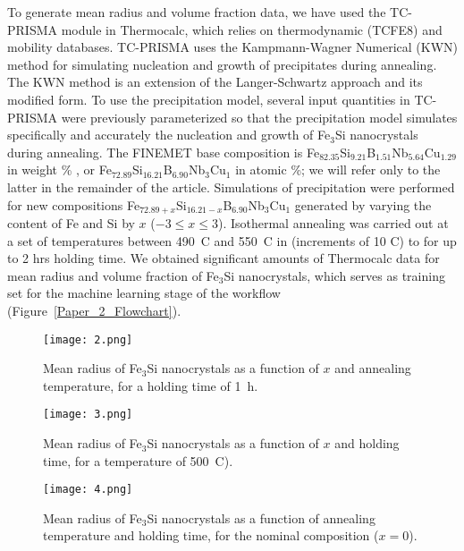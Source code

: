 To generate mean radius and volume fraction data, \cite{CITRINE} we have used the
TC-PRISMA\cite{THERMOCALC_TCPRISMA} module in Thermocalc, which relies on thermodynamic (TCFE8)\cite{THERMOCALC_TCFE8}  and mobility\cite{THERMOCALC_TCFE8_MOBFE3} databases.
TC-PRISMA\cite{THERMOCALC_TCPRISMA} uses the Kampmann-Wagner Numerical (KWN) method\cite{kampmann1984decomposition, wagner1991homogeneous} for simulating
nucleation and growth of precipitates during annealing. The KWN method is an extension of the Langer-Schwartz approach\cite{langer1980kinetics} and its modified form.\cite{COMPUTHERM}
To use the precipitation model, several input quantities in TC-PRISMA\cite{THERMOCALC_TCPRISMA} were previously parameterized\cite{jha2017FINEMET_CALPHAD} so that the
precipitation model simulates specifically and accurately the nucleation and growth of Fe$_3$Si nanocrystals  during
annealing.
The FINEMET base composition is  Fe$_{82.35}$Si$_{9.21}$B$_{1.51}$Nb$_{5.64}$Cu$_{1.29}$ in  weight \% , or  Fe$_{72.89}$Si$_{16.21}$B$_{6.90}$Nb$_{3}$Cu$_{1}$ in atomic \%; we will refer only to the latter in the remainder of the article.
Simulations of precipitation were performed for new compositions Fe$_{72.89 +x}$Si$_{16.21-x}$B$_{6.90}$Nb$_{3}$Cu$_{1}$ generated by varying the content of Fe and Si by $x$ ($-3 \leq x \leq 3$). Isothermal annealing was carried out at a set of temperatures between 490~\degree C and 550~\degree C in (increments of 10 \degree C) to for up to 2 hrs holding time. We obtained significant amounts of Thermocalc data for mean radius and volume fraction of Fe$_3$Si nanocrystals, \cite{CITRINE} which serves as training set for the machine learning stage of the workflow (Figure~\ref{Paper_2_Flowchart}).

\begin{figure}[ht]
\centering
\texttt{[image: 2.png]}
\caption{Mean radius of Fe$_3$Si nanocrystals as a function of $x$ and  annealing temperature, for a holding time of 1~h.\cite{CITRINE}}
\label{Mean_rad_3D_Temp_X}
\end{figure}

\begin{figure}[ht]
\centering
\texttt{[image: 3.png]}
\caption{Mean radius of Fe$_3$Si nanocrystals as a function of $x$ and  holding time, for a temperature of 500~\degree C).\cite{CITRINE} }
\label{Mean_rad_3D_Time_X}
\end{figure}

\begin{figure}[ht]
\centering
\texttt{[image: 4.png]}
\caption{Mean radius of Fe$_3$Si nanocrystals as a function of annealing temperature and holding time, for the nominal composition ($x=0$).\cite{CITRINE}}
\label{Mean_rad_3D_Temp_Time}
\end{figure}


